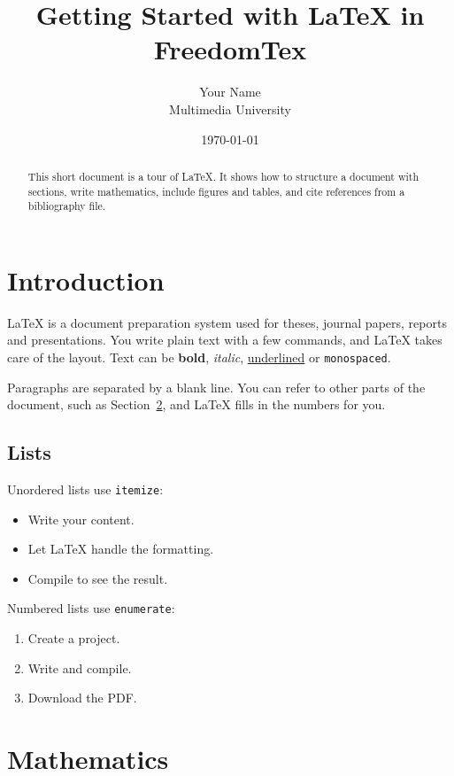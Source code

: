 \documentclass[11pt,a4paper]{article}
\title{Getting Started with \LaTeX{} in FreedomTex}
\author{Your Name\\\small Multimedia University}
\date{\today}
\begin{document}
\maketitle

\begin{abstract}
This short document is a tour of \LaTeX. It shows how to structure a document with sections, write mathematics, include figures and tables, and cite references from a bibliography file.
\end{abstract}

\tableofcontents

\section{Introduction}
\label{sec:intro}

\LaTeX{} is a document preparation system used for theses, journal papers, reports and presentations. You write plain text with a few commands, and \LaTeX{} takes care of the layout. Text can be \textbf{bold}, \textit{italic}, \underline{underlined} or \texttt{monospaced}.

Paragraphs are separated by a blank line. You can refer to other parts of the document, such as Section~\ref{sec:maths}, and \LaTeX{} fills in the numbers for you.

\subsection{Lists}

Unordered lists use \texttt{itemize}:
\begin{itemize}
    \item Write your content.
    \item Let \LaTeX{} handle the formatting.
    \item Compile to see the result.
\end{itemize}

Numbered lists use \texttt{enumerate}:
\begin{enumerate}
    \item Create a project.
    \item Write and compile.
    \item Download the PDF.
\end{enumerate}

\section{Mathematics}
\label{sec:maths}
\end{document}
